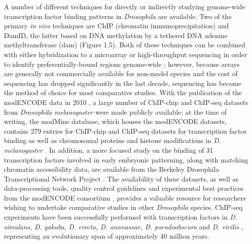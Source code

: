 A number of different techniques for directly or indirectly studying genome-wide transcription factor binding patterns in \emph{Drosophila} are available. Two of the primary \emph{in vivo} techniques are ChIP (chromatin immunoprecipitation) and DamID, the latter based on DNA methylation by a tethered DNA adenine methyltransferase (dam) \citep{greil_[16]_2006} (Figure 1.5). Both of these techniques can be combined with either hybridization to a microarray or high-throughput sequencing in order to identify preferentially-bound regions genome-wide \citep{aleksic_chiping_2009,van_steensel_chromatin_2001}; however, because arrays are generally not commercially available for non-model species and the cost of sequencing has dropped significantly in the last decade, sequencing has become the method of choice for most comparative studies. With the publication of the modENCODE data in 2010 \citep{the_modencode_consortium_identification_2010}, a large number of ChIP-chip and ChIP-seq datasets from \emph{Drosophila melanogaster} were made publicly available; at the time of writing, the modMine database, which houses the modENCODE datasets, contains 279 entries for ChIP-chip and ChIP-seq datasets for transcription factor binding as well as chromosomal proteins and histone modifications in \emph{D. melanogaster} \citep{contrino_modmine:_2011}. In addition, a more focused study on the binding of 31 transcription factors involved in early embryonic patterning, along with matching chromatin accessibility data, are available from the Berkeley Drosophila Transcriptional Network Project \citep{macarthur_developmental_2009}. The availability of these datasets, as well as data-processing tools, quality control guidelines and experimental best practices from the modENCODE consortium \citep{landt_chip-seq_2012,trinh_cloud-based_2013}, provides a valuable resource for researchers wishing to undertake comparative studies in other \emph{Drosophila} species. ChIP-seq experiments have been successfully performed with transcription factors in \emph{D. simulans, D. yakuba, D. erecta, D. ananassae, D. pseudoobscura} and \emph{D. virilis} \citep{bradley_binding_2010,he_high_2011,paris_extensive_2013,villar_evolution_2014}, representing an evolutionary span of approximately 40 million years.

